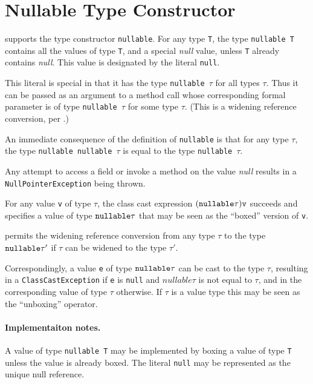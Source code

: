 \section{Nullable Type Constructor} 

 supports the type constructor {\tt nullable}. 
For any type {\tt T}, the type {\tt nullable T} contains all the
values of type {\tt T}, and a special {\em null} value, unless {\tt T}
already contains {\em null}. This value is designated by the literal
{\tt null}. 

This literal is special in that it has the type {\tt nullable $\tau$}
for all types $\tau$. Thus it can be passed as an argument to a method
call whose corresponding formal parameter is of type {\tt nullable
$\tau$} for some type $\tau$. (This is a widening reference
conversion, per \cite[Sec 5.1.4]{jls}.)

An immediate consequence of the definition of {\tt nullable} is that
for any type $\tau$, the type {\tt nullable nullable $\tau$} is equal
to the type {\tt nullable $\tau$}.

Any attempt to access a field or invoke a method on the value {\em null}
results in a {\tt NullPointerException} being thrown.

For any value {\tt v} of type $\tau$, the class cast expression $\tt
(nullable \tau) v$ succeeds and specifies a value 
of type $\tt nullable \tau$ that may be seen as the ``boxed'' version
of {\tt v}. 

 permits the widening reference conversion from any type $\tau$
to the type $\tt nullable \tau'$ if $\tau$ can be widened
to the type $\tau'$. 



Correspondingly, a value {\tt e} of type $\tt nullable \tau$ can be
cast to the type $\tau$, resulting in a {\tt ClassCastException} if
{\tt e} is {\tt null} and $nullable \tau$ is not equal to $\tau$, and
in the corresponding value of type $\tau$ otherwise.  If $\tau$ is a
value type this may be seen as the ``unboxing'' operator.



\paragraph{Implementaiton notes.}

A value of type {\tt nullable T} may be implemented by boxing a value of
type {\tt T} unless the value is already boxed. The literal {\tt null}
may be represented as the unique null reference.

